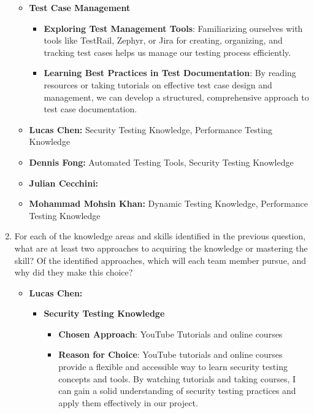 \documentclass[12pt, titlepage]{article}
\begin{document}
\begin{enumerate}
\begin{itemize}
    \item \textbf{Test Case Management}
    \begin{itemize}
        \item \textbf{Exploring Test Management Tools}: Familiarizing ourselves with tools like TestRail, Zephyr, or Jira for creating, organizing, and tracking test cases helps us manage our testing process efficiently.
        \item \textbf{Learning Best Practices in Test Documentation}: By reading resources or taking tutorials on effective test case design and management, we can develop a structured, comprehensive approach to test case documentation.
    \end{itemize}

  \end{itemize}

  \begin{itemize}
    \item \textbf{Lucas Chen:} Security Testing Knowledge, Performance Testing Knowledge
    \item \textbf{Dennis Fong:} Automated Testing Tools, Security Testing Knowledge
    \item \textbf{Julian Cecchini:} 
    \item \textbf{Mohammad Mohsin Khan:} Dynamic Testing Knowledge, Performance Testing Knowledge
  \end{itemize}


  \item For each of the knowledge areas and skills identified in the previous
  question, what are at least two approaches to acquiring the knowledge or
  mastering the skill?  Of the identified approaches, which will each team
  member pursue, and why did they make this choice?
  
  \begin{itemize}
    \item \textbf{Lucas Chen:} 
    \begin{itemize}
        \item \textbf{Security Testing Knowledge}  
        \begin{itemize}
            \item \textbf{Chosen Approach}: YouTube Tutorials and online courses
            \item \textbf{Reason for Choice}: YouTube tutorials and online courses provide a flexible and 
            accessible way to learn security testing concepts and tools. By watching tutorials and taking courses, 
            I can gain a solid understanding of security testing practices and apply them effectively in our project.
        \end{itemize}
    

\end{itemize}
\end{itemize}
\end{enumerate}
\end{document}
